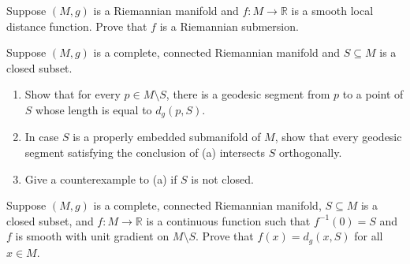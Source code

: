 \begin{exercise}
\label{prob:distance-function-submersion}

Suppose $(M, g)$ is a Riemannian manifold and $f : M \to \mathbb{R}$ is a smooth local distance function. Prove that $f$ is a Riemannian submersion.
\end{exercise}

\begin{exercise}
\label{prob:geodesic-to-closed-subset}

Suppose $(M, g)$ is a complete, connected Riemannian manifold and $S \subseteq M$ is a closed subset.
\begin{enumerate}
\item[(a)] Show that for every $p \in M \setminus S$, there is a geodesic segment from $p$ to a point of $S$ whose length is equal to $d_g(p, S)$.
\item[(b)] In case $S$ is a properly embedded submanifold of $M$, show that every geodesic segment satisfying the conclusion of (a) intersects $S$ orthogonally.
\item[(c)] Give a counterexample to (a) if $S$ is not closed.
\end{enumerate}
\end{exercise}

\begin{exercise}
\label{prob:smooth-function-equals-distance}

Suppose $(M, g)$ is a complete, connected Riemannian manifold, $S \subseteq M$ is a closed subset, and $f : M \to \mathbb{R}$ is a continuous function such that $f^{-1}(0) = S$ and $f$ is smooth with unit gradient on $M \setminus S$. Prove that $f(x) = d_g(x, S)$ for all $x \in M$.
\end{exercise}

